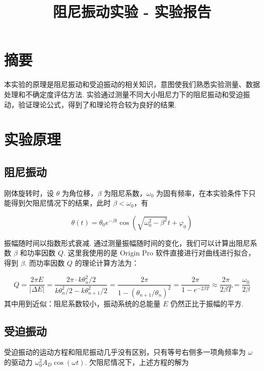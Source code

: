 \documentclass{THUexprep}
\begin{document}
\title{阻尼振动实验 - 实验报告}
\maketitle

\section{摘要}
本实验的原理是阻尼振动和受迫振动的相关知识，意图使我们熟悉实验测量、数据处理和不确定度评估方法. 实验通过测量不同大小阻尼力下的阻尼振动和受迫振动，验证理论公式，得到了和理论符合较为良好的结果.

\section{实验原理}
\subsection{阻尼振动}
刚体旋转时，设 $\theta$ 为角位移，$\beta$ 为阻尼系数，$\omega_0$ 为固有频率，在本实验条件下只能得到欠阻尼情况下的结果，此时 $\beta<\omega_0$，有

\begin{equation}
    \theta(t) = \theta_0 e^{-\beta t} \cos(\sqrt{\omega_0^2-\beta^2} t + \varphi_0)
\end{equation}

振幅随时间以指数形式衰减. 通过测量振幅随时间的变化，我们可以计算出阻尼系数 $\beta$ 和功率因数 $Q$. 这里我使用的是 Origin Pro 软件直接进行对曲线进行拟合，得到 $\beta$. 而功率因数 $Q$ 的理论计算方法为：

\begin{equation}
    Q =\frac{2\pi E}{|\Delta E|}=\frac{2\pi\cdot k\theta_n^2/2}{k\theta_n^2/2-k\theta_{n+1}^2/2}
    =\frac{2\pi}{1-(\theta_{n+1}/\theta_n)^2}
    = \frac{2\pi}{1-e^{-2\beta T}}
    \approx \frac{2\pi}{2\beta T} = \frac{\omega_0}{2\beta}
\end{equation}
\newline
其中用到近似：阻尼系数较小，振动系统的总能量 $E$ 仍然正比于振幅的平方.

\subsection{受迫振动}
受迫振动的运动方程和阻尼振动几乎没有区别，只有等号右侧多一项角频率为 $\omega$ 的驱动力 $\omega_0^2A_D\cos(\omega t)$. 欠阻尼情况下，上述方程的解为
\end{document}
